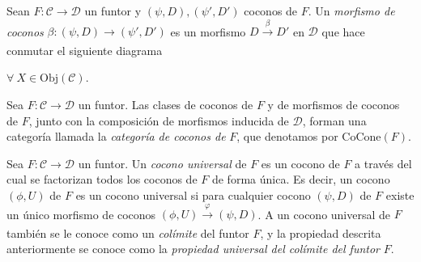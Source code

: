 \documentclass[tesis]{subfiles}
\begin{document}
\begin{Def}\label{Def: Morfismo de coconos}
    Sean $F:\mathscr{C}\to \mathscr{D}$ un funtor y $(\psi,D), (\psi',D')$ coconos de $F$. Un \emph{morfismo de coconos} $\beta:(\psi,D)\to (\psi',D')$ es un morfismo $D\xrightarrow[]{\beta} D'$ en $\mathscr{D}$ que hace conmutar el siguiente diagrama
    \begin{center}
        $\forall \ X\in \text{Obj}(\mathscr{C})$.
    \end{center}
\end{Def}

\begin{Obs}\label{Obs: morfismos de coconos}
    Sea $F:\mathscr{C}\to \mathscr{D}$ un funtor. Las clases de coconos de $F$ y de morfismos de coconos de $F$, junto con la composición de morfismos inducida de $\mathscr{D}$, forman una categoría llamada la \emph{categoría de coconos de} $F$, que denotamos por $\text{CoCone}(F)$. %
\end{Obs}

\begin{Def} \label{Def: colímite}
    Sea $F:\mathscr{C}\to \mathscr{D}$ un funtor. Un \emph{cocono universal} de $F$ es un cocono de $F$ a través del cual se factorizan todos los coconos de $F$ de forma única. Es decir, un cocono $(\phi,U)$ de $F$ es un cocono universal si para cualquier cocono $(\psi,D)$ de $F$ existe un único morfismo de coconos $(\phi,U)\xrightarrow[]{\varphi} (\psi,D)$. A un cocono universal de $F$ también se le conoce como un \emph{colímite} del funtor $F$, y la propiedad descrita anteriormente se conoce como la \emph{propiedad universal del colímite del funtor} $F$.
\end{Def}
\end{document}
